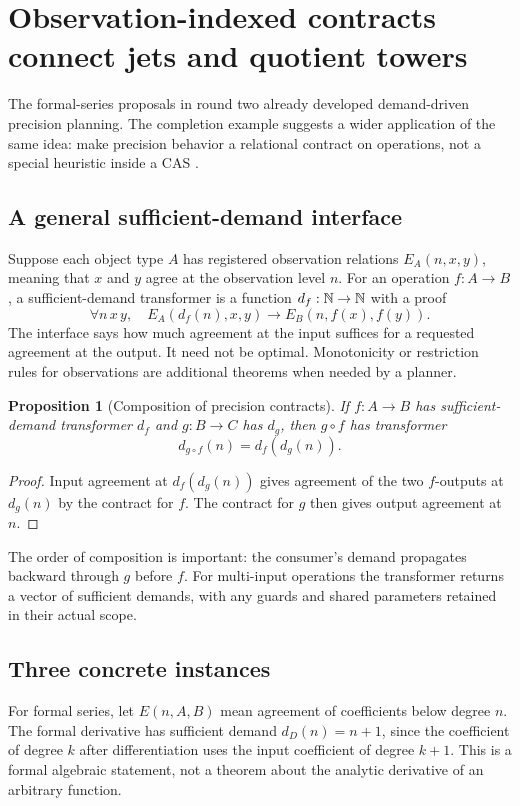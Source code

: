 \documentclass[11pt,a4paper]{article}
\theoremstyle{plain}
\newtheorem{proposition}{Proposition}[section]
\theoremstyle{definition}
\theoremstyle{remark}
\begin{document}
\section{Observation-indexed contracts connect jets and quotient towers}
\label{sec:precision}
The formal-series proposals in round two already developed demand-driven
precision planning. The completion example suggests a wider application of
the same idea: make precision behavior a relational contract on operations,
not a special heuristic inside a CAS \cite{synthesis,workbenches}.

\subsection{A general sufficient-demand interface}
Suppose each object type $A$ has registered observation relations
$E_A(n,x,y)$, meaning that $x$ and $y$ agree at the observation level $n$.
For an operation $f:A\to B$, a sufficient-demand transformer is a function
$d_f:\mathbb N\to\mathbb N$ with a proof
\[
 \forall n\,x\,y,\quad
 E_A(d_f(n),x,y)\to E_B(n,f(x),f(y)).
\]
The interface says how much agreement at the input suffices for a requested
agreement at the output. It need not be optimal. Monotonicity or restriction
rules for observations are additional theorems when needed by a planner.

\begin{proposition}[Composition of precision contracts]
If $f:A\to B$ has sufficient-demand transformer $d_f$ and $g:B\to C$ has
$d_g$, then $g\circ f$ has transformer
\[
 d_{g\circ f}(n)=d_f(d_g(n)).
\]
\end{proposition}
\begin{proof}
Input agreement at $d_f(d_g(n))$ gives agreement of the two $f$-outputs at
$d_g(n)$ by the contract for $f$. The contract for $g$ then gives output
agreement at $n$.
\end{proof}
The order of composition is important: the consumer's demand propagates
backward through $g$ before $f$. For multi-input operations the transformer
returns a vector of sufficient demands, with any guards and shared parameters
retained in their actual scope.

\subsection{Three concrete instances}
For formal series, let $E(n,A,B)$ mean agreement of coefficients below degree
$n$. The formal derivative has sufficient demand $d_D(n)=n+1$, since the
coefficient of degree $k$ after differentiation uses the input coefficient of
degree $k+1$. This is a formal algebraic statement, not a theorem about the
analytic derivative of an arbitrary function.
\end{document}
